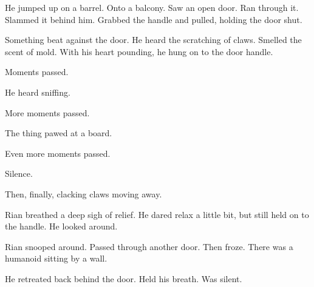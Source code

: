 He jumped up on a barrel. 
Onto a balcony. 
Saw an open door. 
Ran through it. 
Slammed it behind him. 
Grabbed the handle and pulled, holding the door shut. 

Something beat against the door. 
He heard the scratching of claws. 
Smelled the scent of mold. 
With his heart pounding, he hung on to the door handle. 

Moments passed. 

He heard sniffing. 

More moments passed. 

The thing pawed at a board. 


Even more moments passed. 

Silence. 


Then, finally, clacking claws moving away. 

Rian breathed a deep sigh of relief. 
He dared relax a little bit, but still held on to the handle. 
He looked around. 

\begin{comment}
\subsection{Rian sees living building}
\end{comment}

% 


Rian snooped around. 
Passed through another door. 
Then froze. 
There was a humanoid sitting by a wall. 

He retreated back behind the door. 
Held his breath. 
Was silent. 

